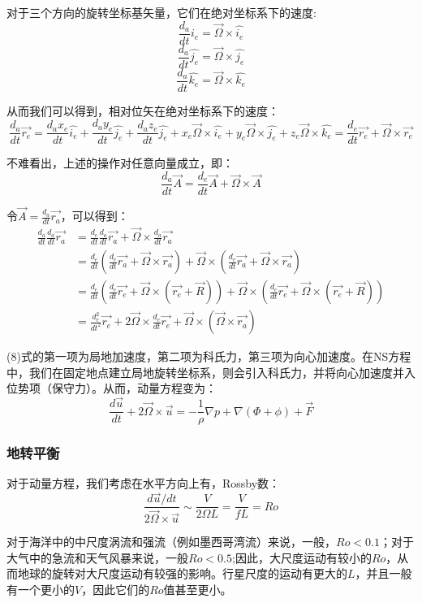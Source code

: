 \documentclass{article}
\begin{document}
对于三个方向的旋转坐标基矢量，它们在绝对坐标系下的速度:
$$\frac{d_a}{dt}\hat{i_e} = \vec{\Omega}\times\hat{i_e} $$
$$\frac{d_a}{dt}\hat{j_e} = \vec{\Omega}\times\hat{j_e} $$
$$\frac{d_a}{dt}\hat{k_e} = \vec{\Omega}\times\hat{k_e} $$

从而我们可以得到，相对位矢在绝对坐标系下的速度：
$$\frac{d_a}{dt}\vec{r_e} = \frac{d_ax_e}{dt}\hat{i_e} +\frac{d_ay_e}{dt}\hat{j_e} +\frac{d_az_e}{dt}\hat{j_e}+ x_e \vec{\Omega}\times\hat{i_e}+ y_e \vec{\Omega}\times\hat{j_e}+ z_e \vec{\Omega}\times\hat{k_e}=\frac{d_e}{dt}\vec{r_e}+\vec{\Omega}\times\vec{r_e} $$

不难看出，上述的操作对任意向量成立，即：
$$\frac{d_a}{dt} \vec{A} = \frac{d_e}{dt} \vec{A} + \vec{\Omega}\times\vec{A}$$

令$\vec{A}=\frac{d_a}{dt}\vec{r_a}$，可以得到：
\begin{align}
\frac{d_a}{dt} \frac{d_a}{dt}\vec{r_a} &=\frac{d_e}{dt} \frac{d_a}{dt}\vec{r_a} + \vec{\Omega}\times\frac{d_a}{dt}\vec{r_a} \\
& = \frac{d_e}{dt} (\frac{d_e}{dt}\vec{r_a}+\vec{\Omega}\times\vec{r_a}) + \vec{\Omega}\times(\frac{d_e}{dt}\vec{r_a}+\vec{\Omega}\times\vec{r_a})\\
& = \frac{d_e}{dt} (\frac{d_e}{dt}\vec{r_e}+\vec{\Omega}\times(\vec{r_e}+\vec{R})) + \vec{\Omega}\times(\frac{d_e}{dt}\vec{r_e}+\vec{\Omega}\times(\vec{r_e}+\vec{R}))\\
& = \frac{d_e^2}{dt^2} \vec{r_e} + 2\vec{\Omega}\times\frac{d_e}{dt}\vec{r_e}+\vec{\Omega}\times(\vec{\Omega}\times\vec{r_a})
\end{align}

(8)式的第一项为局地加速度，第二项为科氏力，第三项为向心加速度。在NS方程中，我们在固定地点建立局地旋转坐标系，则会引入科氏力，并将向心加速度并入位势项（保守力）。从而，动量方程变为：
$$\frac{d\vec{u}}{dt} + 2\vec{\Omega}\times\vec{u} = -\frac{1}{\rho}\nabla p + \nabla(\Phi+\phi)+\vec{F}$$

\subsubsection{地转平衡}
对于动量方程，我们考虑在水平方向上有，Rossby数：
$$\frac{d\vec{u}/dt}{2\vec{\Omega}\times\vec{u}}\sim\frac{V}{2\Omega L}=\frac{V}{fL}=Ro$$

对于海洋中的中尺度涡流和强流（例如墨西哥湾流）来说，一般，$Ro<0.1$；对于大气中的急流和天气风暴来说，一般$Ro<0.5$;因此，大尺度运动有较小的$Ro$，从而地球的旋转对大尺度运动有较强的影响。行星尺度的运动有更大的$L$，并且一般有一个更小的$V$，因此它们的$Ro$值甚至更小。
\end{document}
